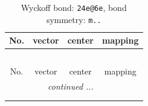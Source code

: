 \documentclass[fleqn,8pt]{jsarticle}
\begin{document}
\renewcommand{\arraystretch}{1.2}
\begin{longtable}{cccc}
\caption{Wyckoff bond: {\tt 24e@6e}, bond symmetry: {\tt m..}}
 \\
 \hline \hline
No. & vector & center & mapping \\ \hline \endfirsthead

\multicolumn{3}{l}{\tablename\ \thetable{}} \\
 \hline \hline
No. & vector & center & mapping \\ \hline \endhead

 \hline \hline
\multicolumn{3}{r}{\footnotesize\it continued ...} \\ \endfoot

 \hline \hline
\multicolumn{3}{r}{} \\ \endlastfoot


\end{longtable}
\end{document}
